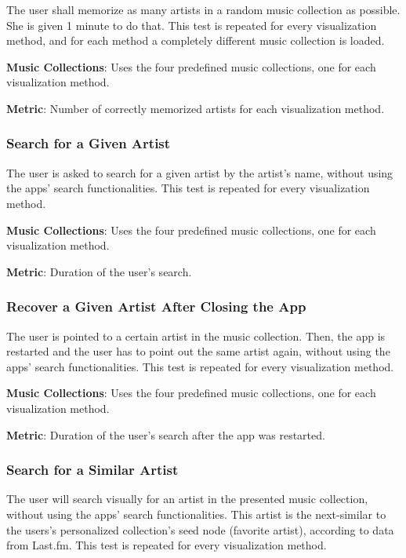 The user shall memorize as many artists in a random music collection as possible. She is given 1 minute to do that. This test is repeated for every visualization method, and for each method a completely different music collection is loaded.

\textbf{Music Collections}: Uses the four predefined music collections, one for each visualization method.

\textbf{Metric}: Number of correctly memorized artists for each visualization method.

	
\subsubsection{Search for a Given Artist}
	
The user is asked to search for a given artist by the artist's name, without using the apps' search functionalities. This test is repeated for every visualization method.

\textbf{Music Collections}: Uses the four predefined music collections, one for each visualization method. 

\textbf{Metric}: Duration of the user's search.
	
	
\subsubsection{Recover a Given Artist After Closing the App}
	
The user is pointed to a certain artist in the music collection. Then, the app is restarted and the user has to point out the same artist again, without using the apps' search functionalities. This test is repeated for every visualization method.

\textbf{Music Collections}: Uses the four predefined music collections, one for each visualization method. 

\textbf{Metric}: Duration of the user's search after the app was restarted.
	
	
\subsubsection{Search for a Similar Artist}

The user will search visually for an artist in the presented music collection, without using the apps' search functionalities. This artist is the next-similar to the users's personalized collection's seed node (favorite artist), according to data from Last.fm. This test is repeated for every visualization method.

